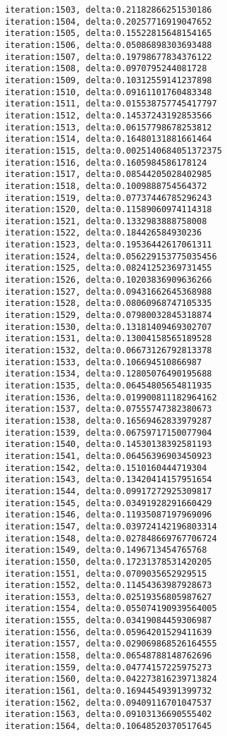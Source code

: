 \documentclass[11pt]{article}
\begin{document}
\begin{Verbatim}[commandchars=\\\{\}]
iteration:1503, delta:0.21182866251530186
iteration:1504, delta:0.20257716919047652
iteration:1505, delta:0.15522815648154165
iteration:1506, delta:0.05086898303693488
iteration:1507, delta:0.19798677834376122
iteration:1508, delta:0.0970795244081728
iteration:1509, delta:0.10312559141237898
iteration:1510, delta:0.09161101760483348
iteration:1511, delta:0.015538757745417797
iteration:1512, delta:0.14537243192853566
iteration:1513, delta:0.06157798678253812
iteration:1514, delta:0.16480131881661464
iteration:1515, delta:0.0025140684051372375
iteration:1516, delta:0.1605984586178124
iteration:1517, delta:0.08544205028402985
iteration:1518, delta:0.1009888754564372
iteration:1519, delta:0.07737446785296243
iteration:1520, delta:0.11589060974114318
iteration:1521, delta:0.1332983888758008
iteration:1522, delta:0.184426584930236
iteration:1523, delta:0.19536442617061311
iteration:1524, delta:0.056229153775035456
iteration:1525, delta:0.08241252369731455
iteration:1526, delta:0.10203836909636266
iteration:1527, delta:0.09431662645368988
iteration:1528, delta:0.08060968747105335
iteration:1529, delta:0.07980032845318874
iteration:1530, delta:0.13181409469302707
iteration:1531, delta:0.13004158565189528
iteration:1532, delta:0.06673126792813378
iteration:1533, delta:0.106694510866987
iteration:1534, delta:0.12805076490195688
iteration:1535, delta:0.06454805654811935
iteration:1536, delta:0.019900811182964162
iteration:1537, delta:0.07555747382380673
iteration:1538, delta:0.16569462833979287
iteration:1539, delta:0.06759717150077904
iteration:1540, delta:0.14530138392581193
iteration:1541, delta:0.06456396903450923
iteration:1542, delta:0.1510160444719304
iteration:1543, delta:0.13420414157951654
iteration:1544, delta:0.09917272925309817
iteration:1545, delta:0.03491928291660429
iteration:1546, delta:0.11935087197969096
iteration:1547, delta:0.039724142196803314
iteration:1548, delta:0.027848669767706724
iteration:1549, delta:0.1496713454765768
iteration:1550, delta:0.17231378531420205
iteration:1551, delta:0.0709035652929515
iteration:1552, delta:0.11454363987928673
iteration:1553, delta:0.02519356805987627
iteration:1554, delta:0.055074190939564005
iteration:1555, delta:0.03419084459306987
iteration:1556, delta:0.05964201529411639
iteration:1557, delta:0.029069868526164555
iteration:1558, delta:0.06548788148762696
iteration:1559, delta:0.04774157225975273
iteration:1560, delta:0.042273816239713824
iteration:1561, delta:0.16944549391399732
iteration:1562, delta:0.09409116701047537
iteration:1563, delta:0.09103136690555402
iteration:1564, delta:0.10648520370517645

\end{Verbatim}
\end{document}
